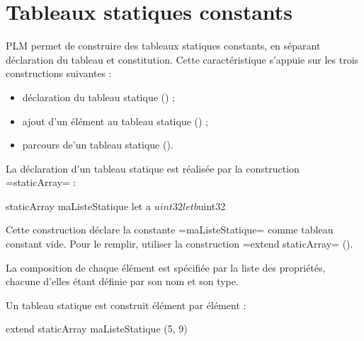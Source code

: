 




\chapter{Tableaux statiques constants}

PLM permet de construire des tableaux statiques constants, en séparant déclaration du tableau et constitution. Cette caractéristique s'appuie sur les trois constructions suivantes :
\begin{itemize}
  \item déclaration du tableau statique () ;
  \item ajout d'un élément au tableau statique () ;
  \item parcours de'un tableau statique ().
\end{itemize}












La déclaration d'un tableau statique est réalisée par la construction \plm=staticArray= :

\begin{PLM}
staticArray maListeStatique {
  let a $uint32
  let b $uint32
}
\end{PLM}

Cette construction déclare la constante \plm=maListeStatique= comme tableau constant vide. Pour le remplir, utiliser la construction \plm=extend staticArray= ().

La composition de chaque élément est spécifiée par la liste des propriétés, chacune d'elles étant définie par son nom et son type.










Un tableau statique est construit élément par élément : 

\begin{PLM}
extend staticArray maListeStatique (5, 9)
\end{PLM}

